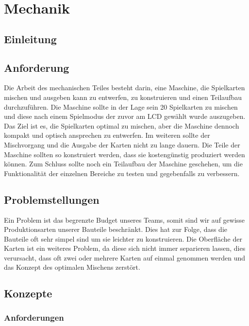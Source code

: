 \chapter{Mechanik}
\section{Einleitung}

\section{Anforderung}
\label{sec:Anforderung}
Die Arbeit des mechanischen Teiles besteht darin, eine Maschine,
die Spielkarten mischen und ausgeben kann zu entwerfen, zu konstruieren
und einen Teilaufbau durchzuführen. Die Maschine sollte in der Lage
sein 20 Spielkarten zu mischen und diese nach einem Spielmodus der
zuvor am LCD gewählt wurde auszugeben. Das Ziel ist es, die Spielkarten
optimal zu mischen, aber die Maschine dennoch kompakt und optisch
ansprechen zu entwerfen. Im weiteren sollte der Mischvorgang und die
Ausgabe der Karten nicht zu lange dauern. Die Teile der Maschine
sollten so konstruiert werden, dass sie kostengünstig produziert
werden können. Zum Schluss sollte noch ein Teilaufbau der Maschine
geschehen, um die Funktionalität der einzelnen Bereiche zu testen
und gegebenfalls zu verbessern.

\section{Problemstellungen}
Ein Problem ist das begrenzte Budget unseres Teams, somit sind
wir auf gewisse Produktionsarten unserer Bauteile beschränkt.
Dies hat zur Folge, dass die Bauteile oft sehr simpel sind um
sie leichter zu konstruieren. Die Oberfläche der Karten ist ein
weiteres Problem, da diese sich nicht immer separieren lassen, dies
verursacht, dass oft zwei oder mehrere Karten auf einmal genommen
werden und das Konzept des optimalen Mischens zerstört.

\section{Konzepte}

\subsection{Anforderungen}

